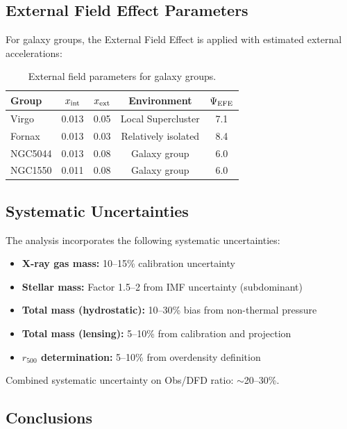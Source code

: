 \subsection{External Field Effect Parameters}

For galaxy groups, the External Field Effect is applied with estimated external accelerations:

\begin{table}[h]
\centering
\caption{External field parameters for galaxy groups.}\label{tab:efe-params}
\renewcommand{\arraystretch}{1.2}
\begin{tabular}{lcccc}
\toprule
Group & $x_{\rm int}$ & $x_{\rm ext}$ & Environment & $\Psi_{\rm EFE}$ \\
\midrule
Virgo & 0.013 & 0.05 & Local Supercluster & 7.1 \\
Fornax & 0.013 & 0.03 & Relatively isolated & 8.4 \\
NGC5044 & 0.013 & 0.08 & Galaxy group & 6.0 \\
NGC1550 & 0.011 & 0.08 & Galaxy group & 6.0 \\
\bottomrule
\end{tabular}
\end{table}

\subsection{Systematic Uncertainties}

The analysis incorporates the following systematic uncertainties:

\begin{itemize}
\item \textbf{X-ray gas mass:} 10--15\% calibration uncertainty
\item \textbf{Stellar mass:} Factor 1.5--2 from IMF uncertainty (subdominant)
\item \textbf{Total mass (hydrostatic):} 10--30\% bias from non-thermal pressure
\item \textbf{Total mass (lensing):} 5--10\% from calibration and projection
\item \textbf{$r_{500}$ determination:} 5--10\% from overdensity definition
\end{itemize}

Combined systematic uncertainty on Obs/DFD ratio: $\sim$20--30\%.

\subsection{Conclusions}

